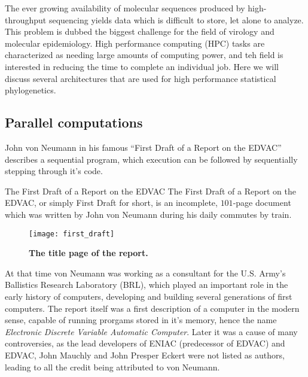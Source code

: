 The ever growing availability of molecular sequences produced by high-throughput sequencing yields data which is difficult to store, let alone to analyze.
This problem is dubbed the biggest challenge for the field of virology and molecular epidemiology. 
High performance computing (HPC) tasks are characterized as needing large amounts of computing power, and teh field is interested in reducing the time to complete an individual job.
Here we will discuss several architectures that are used for high performance statistical phylogenetics. 

\subsection{Parallel computations}

John von Neumann in his famous ``First Draft of a Report on the EDVAC'' \citep{vonNeumann1945} describes a sequential program, which execution can be followed by sequentially stepping through it's code.

\begin{remark}{The First Draft of a Report on the EDVAC}
The First Draft of a Report on the EDVAC, or simply First Draft for short, is an incomplete, $101$-page document which was written by John von Neumann during his daily commutes by train.
\begin{figure}[H]
\centering
\texttt{[image: first\_draft]}
\caption{
{ \footnotesize 
{\bf The title page of the report.}
} %
}
\label{fig:vonNeumann}
\end{figure}

At that time von Neumann was working as a consultant for the U.S. Army's Ballistics Research Laboratory (BRL), which played an important role in the early history of computers, developing and building several generations of first computers.
The report itself was a first description of a computer in the modern sense, capable of running prorgams stored in it's memory, hence the name \textit{Electronic Discrete Variable Automatic Computer}.
Later it was a cause of many controversies, as the lead developers of ENIAC (predecessor of EDVAC) and EDVAC, John Mauchly and John Presper Eckert were not listed as authors, leading to all the credit being attributed to von Neumann.
\end{remark}


